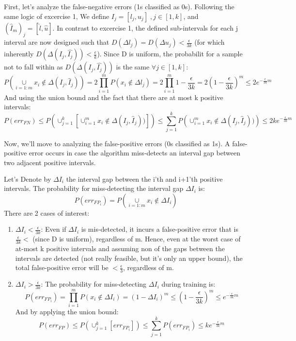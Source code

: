 First, let's analyze the false-negative errors (1s classified as 0s).
Following the same logic of excercise 1, We define $I_j = [l_j, u_j] \;, j\in [1, k]$, and $(\hat{I}_m)_j = [\hat{l}, \hat{u}]$.
In contrast to excercise 1, the defined sub-intervals for each j interval are now designed such that $D(\Delta l_j) = D(\Delta u_j) < \frac{\epsilon}{3k}$
(for which inherently $D(\Delta(I_j, \hat{I_j})) < \frac{\epsilon}{k}$). Since D is uniform, the probabilit for a sample not to fall within as $D(\Delta(I_j, \hat{I_j}))$ is the same $\forall j\in[1, k]$:
\begin{equation*}
    P(\underset{i=1:m}{\cup} x_i \notin \Delta(I_j, \hat{I}_j)) = 2\prod_{i=1}^{m}P(x_i \notin \Delta l_j) 
    = 2\prod_{i=1}^{m} 1-\frac{\epsilon}{3k}= 2(1-\frac{\epsilon}{3k})^m \leq 2e^{-\frac{\epsilon}{3k}m}
\end{equation*}
And using the union bound and the fact that there are at most k positive intervals:
\begin{equation*}
    P(err_{FN}) \leq P\left(\cup_{j=1}^{k} \left[ \cup_{i=1}^{m} x_i \notin \Delta(I_j, \hat{I}_j)) \right]\right) \leq \sum_{j=1}^{k} P\left(\cup_{i=1}^{m} x_i \notin \Delta(I_j, \hat{I}_j))\right) \leq 2ke^{-\frac{\epsilon}{3k}m}
\end{equation*}


Now, we'll move to analyzing the false-positive errors (0s classified as 1s). 
A false-positive error occurs in case the algorithm miss-detects an interval gap between two adjacent positive intervals.

Let's Denote by $\Delta I_{i}$ the interval gap between the i'th and i+1'th positive intervals.
The probability for miss-detecting the interval gap $\Delta I_{i}$ is:
\begin{equation*}
    P(err_{FP_i}) = P(\underset{i=1:m}{\cup} x_i \notin \Delta I_{i})
\end{equation*}
There are 2 cases of interest:
\begin{enumerate}
    \item $\Delta I_{i} < \frac{\epsilon}{3k}$: Even if $\Delta I_{i}$ is mis-detected, it incurs a false-positive error that is $\frac{\epsilon}{3k} < $ (since D is uniform), regardless of m. Hence, even at the worst case of at-most k positive intervals and assuming non of the gaps between the intervals are detected (not really feasible, but it's only an upper bound), the total false-positive error will be $< \frac{\epsilon}{3}$, regardless of m.
    \item $\Delta I_{i} > \frac{\epsilon}{3k}$: The probability for miss-detecting $\Delta I_{i} $ during training is:
    \begin{equation*}
        P(err_{FP_i}) = \prod_{i=1}^{m}P(x_i \notin \Delta I_{i}) 
        = (1-\Delta I_{i})^m \leq (1-\frac{\epsilon}{3k})^m \leq e^{-\frac{\epsilon}{3k}m}
    \end{equation*}
    And by applying the union bound:
    \begin{equation*}
        P(err_{FP}) \leq P\left(\cup_{j=1}^{k} \left[ err_{FP_i} \right]\right) \leq \sum_{j=1}^{k} P\left(err_{FP_i}\right) \leq ke^{-\frac{\epsilon}{3k}m}
    \end{equation*}
\end{enumerate}

